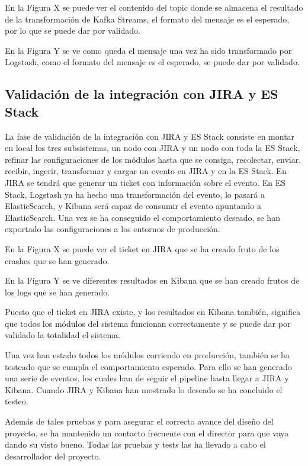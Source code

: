 
En la Figura X se puede ver el contenido del topic donde se almacena el resultado de la transformación de Kafka Streams, el formato del mensaje es el esperado, por lo que se puede dar por validado.

En la Figura Y se ve como queda el mensaje una vez ha sido transformado por Logstash, como el formato del mensaje es el esperado, se puede dar por validado.

\subsection{Validación de la integración con JIRA y ES Stack}
La fase de validación de la integración con JIRA y ES Stack consiste en montar en local los tres subsistemas, un nodo con JIRA y un nodo con toda la ES Stack, refinar las configuraciones de los módulos hasta que se consiga, recolectar, enviar, recibir, ingerir, transformar y cargar un evento en JIRA y en la ES Stack. En JIRA se tendrá que generar un ticket con información sobre el evento. En ES Stack, Logstash ya ha hecho una transformación del evento, lo pasará a ElasticSearch, y Kibana será capaz de consumir el evento apuntando a ElasticSearch. Una vez se ha conseguido el comportamiento deseado, se han exportado las configuraciones a los entornos de producción.


En la Figura X se puede ver el ticket en JIRA que se ha creado fruto de los crashes que se han generado.

En la Figura Y se ve diferentes resultados en Kibana que se han creado frutos de los logs que se han generado.

Puesto que el ticket en JIRA existe, y los resultados en Kibana también, significa que todos los módulos del sistema funcionan correctamente y se puede dar por validado la totalidad el sistema.

Una vez han estado todos los módulos corriendo en producción, también se ha testeado que se cumpla el comportamiento esperado. Para ello se han generado una serie de eventos, los cuales han de seguir el pipeline hasta llegar a JIRA y Kibana. Cuando JIRA y Kibana han mostrado lo deseado se ha concluido el testeo.

Además de tales pruebas y para asegurar el correcto avance del diseño del proyecto, se ha mantenido un contacto frecuente con el director para que vaya dando su visto bueno. Todas las pruebas y tests las ha llevado a cabo el desarrollador del proyecto.
